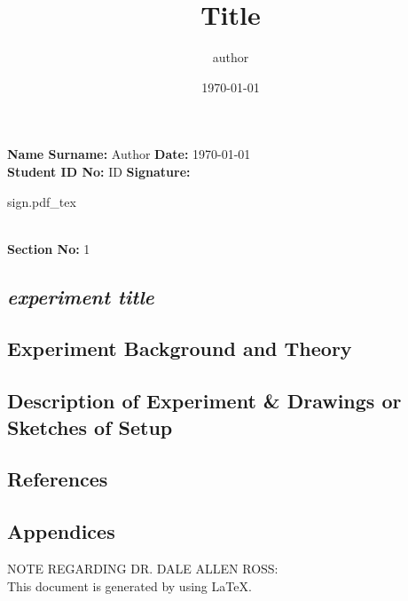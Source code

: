 \documentclass[a4paper, 12pt]{article}
\newcommand{\head}[1]{\section{\normalsize{\textit{#1}}}}
\newcommand{\subhead}[1]{\subsection{\normalsize{#1}}}
\newcommand{\incfig}[1]{%
    \def\svgwidth{\columnwidth}
    {#1.pdf_tex}
}
\begin{document}
    \title{Title}
    \author{author}
    \date{\today}

    \noindent
    \textbf{Name Surname:} Author
    \hfill \textbf{Date:} \today \\
    \textbf{Student ID No:} ID
    \hfill \textbf{Signature:}
    \begin{minipage}[t]{0.05\linewidth}
        \incfig{sign}
    \end{minipage} \\
    \textbf{Section No:} 1


    \begin{center}
        \head{experiment title}
    \end{center}

    \subhead{Experiment Background and Theory}


    \subhead{Description of Experiment \& Drawings or Sketches of Setup}


    \subhead{References}


    \subhead{Appendices}
    \noindent
    NOTE REGARDING DR. DALE ALLEN ROSS: \\
    This document is generated by using LaTeX.


    \clearpage
\end{document}
